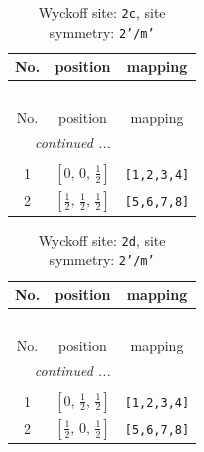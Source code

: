 \documentclass[fleqn,8pt]{jsarticle}
\begin{document}
\begin{longtable}{ccc}
\caption{Wyckoff site: {\tt 2c}, site symmetry: {\tt 2'/m'}}
 \\
 \hline \hline
No. & position & mapping \\ \hline \endfirsthead

\multicolumn{2}{l}{\tablename\ \thetable{}} \\
 \hline \hline
No. & position & mapping \\ \hline \endhead

 \hline \hline
\multicolumn{2}{r}{\footnotesize\it continued ...} \\ \endfoot

 \hline \hline
\multicolumn{2}{r}{} \\ \endlastfoot

1 & $\left[ 0,\, 0,\, \frac{1}{2} \right]$ & {\tt [1,2,3,4]} \\ \hline
2 & $\left[ \frac{1}{2},\, \frac{1}{2},\, \frac{1}{2} \right]$ & {\tt [5,6,7,8]} \\
\end{longtable}
\renewcommand{\arraystretch}{1.2}
\begin{longtable}{ccc}
\caption{Wyckoff site: {\tt 2d}, site symmetry: {\tt 2'/m'}}
 \\
 \hline \hline
No. & position & mapping \\ \hline \endfirsthead

\multicolumn{2}{l}{\tablename\ \thetable{}} \\
 \hline \hline
No. & position & mapping \\ \hline \endhead

 \hline \hline
\multicolumn{2}{r}{\footnotesize\it continued ...} \\ \endfoot

 \hline \hline
\multicolumn{2}{r}{} \\ \endlastfoot

1 & $\left[ 0,\, \frac{1}{2},\, \frac{1}{2} \right]$ & {\tt [1,2,3,4]} \\ \hline
2 & $\left[ \frac{1}{2},\, 0,\, \frac{1}{2} \right]$ & {\tt [5,6,7,8]} \\
\end{longtable}
\renewcommand{\arraystretch}{1.2}
\end{document}

